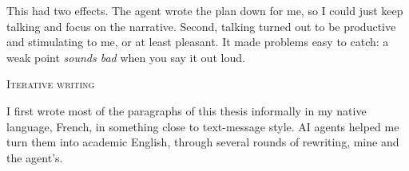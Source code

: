 \begin{center}
\end{center}

\bigskip
\noindent This had two effects. The agent wrote the plan down for me, so I could
just keep talking and focus on the narrative. Second, talking
turned out to be productive and stimulating to me, or at least pleasant. It made problems easy to catch: a weak point \textit{sounds bad} when you say it out
loud.

\vfill

\clearpage
\thispagestyle{empty}

\begin{center}
  {\large\scshape\color{ThesisNeutral} Iterative writing}
\end{center}
\medskip

\noindent I first wrote most of the paragraphs of this thesis informally in my
native language, French, in something close to text-message style. AI agents helped me turn
them into academic English, through several rounds of rewriting, mine and the
agent's.

